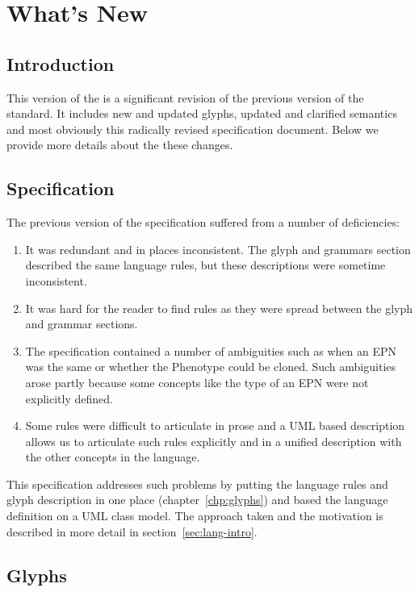 \chapter{What's New}
\label{chap:whatsnew}

\section{Introduction}

This version of the \PDl is a significant revision of the previous version of the standard. It includes new and updated glyphs, updated and clarified semantics and most obviously this radically revised specification document.  Below we provide more details about the these changes.


\section{Specification}

The previous version of the specification suffered from a number of deficiencies:

\begin{enumerate}
\item It was redundant and in places inconsistent. The glyph and grammars section described the same language rules, but these descriptions were sometime inconsistent.
\item It was hard for the reader to find rules as they were spread between the glyph and grammar sections.
\item The specification contained a number of ambiguities such as when an EPN was the same or whether the Phenotype could be cloned. Such ambiguities arose partly because some concepts like the type of an EPN were not explicitly defined.
\item Some rules were difficult to articulate in prose and a UML based description allows us to articulate such rules explicitly and in a unified description with the other concepts in the language.
\end{enumerate}

This specification addresses such problems by putting the language rules and glyph description in one place (chapter~\ref{chp:glyphs}) and based the language definition on a UML class model. The approach taken and the motivation is described in more detail in section~\ref{sec:lang-intro}.

\section{Glyphs}

